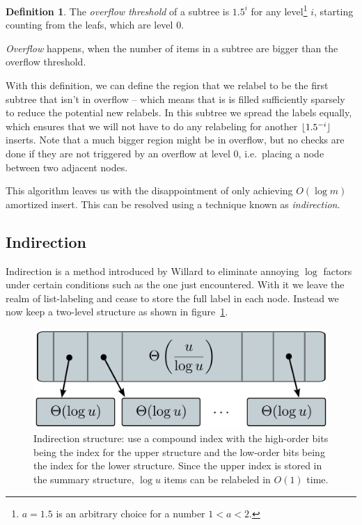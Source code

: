 \documentclass[11pt,a4paper,twoside,openright]{Thesis}
\DeclarePairedDelimiter\floor{\lfloor}{\rfloor}
\theoremstyle{definition}
\newtheorem*{defn}{Definition}
\newcommand{\Figref}[1]{figure~\ref{fig:#1}}
\newcommand{\figlabel}[1]{\label{fig:#1}}
\begin{document}
\begin{defn}
  The \emph{overflow threshold} of a subtree is $1.5^i$ for any
  level\footnote{$a=1.5$ is an arbitrary choice for a number $1 < a < 2$.} $i$,
  starting counting from the leafs, which are level 0.

  \emph{Overflow} happens, when the number of items in a subtree are bigger
  than the overflow threshold.
\end{defn}

With this definition, we can define the region that we relabel to be the
first subtree that isn't in overflow -- which means that is is filled
sufficiently sparsely to reduce the potential new relabels. In this subtree
we spread the labels equally, which ensures that we will not have to
do any relabeling for another $\floor{1.5^{-i}}$ inserts. Note that a much
bigger region might be in overflow, but no checks are done if they are not
triggered by an overflow at level 0, i.e.\ placing a node between two adjacent
nodes.

This algorithm leaves us with the disappointment of only achieving $O(\log m)$
amortized insert. This can be resolved using a technique known as
\emph{indirection}.

\subsection{Indirection}
Indirection is a method introduced by Willard\cite{Will82a} to eliminate
annoying $\log$ factors under certain conditions such as the one just
encountered.  With it we leave the realm of list-labeling and cease to store
the full label in each node. Instead we now keep a two-level structure
as shown in \Figref{graphs/indirection}.

\begin{figure}[htpb]
  \centering
  \includegraphics[width=0.8\linewidth]{graphs/indirection}
  \caption{Indirection structure: use a compound index with the high-order
  bits being the index for the upper structure and the low-order bits being
the index for the lower structure. Since the upper index is stored in the
summary structure, $\log u$ items can be relabeled in $O(1)$ time.}
  \figlabel{graphs/indirection}
\end{figure}
\end{document}
